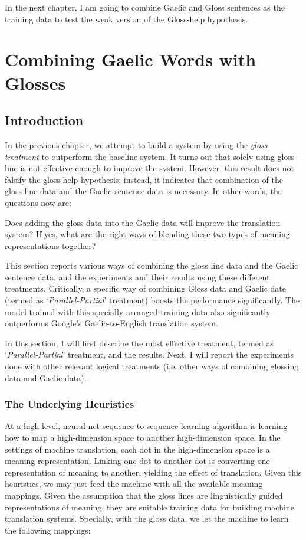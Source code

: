 \documentclass[final]{ua-thesis}
\numberwithin{equation}{section}
\begin{document}
In the next chapter, I am going to combine Gaelic and Gloss sentences as the training data to test the weak version of the Gloss-help hypothesis. 
\chapter{Combining Gaelic Words with Glosses}\label{chap:cake2}
\section{Introduction}
In the previous chapter, we attempt to build a system by using the \textit{gloss treatment} to outperform the baseline system. It turns out that solely using gloss line is not effective enough to improve the system. However, this result does not falsify the gloss-help hypothesis; instead, it indicates that combination of the gloss line data and the Gaelic sentence data is necessary. In other words, the questions now are: 
\begin{exe}
	\ex 
	\begin{xlist}
		\ex Does adding the gloss data into the Gaelic data will improve the translation system? 
		\ex If yes, what are the right ways of blending these two types of meaning representations together? 
	\end{xlist}	
\end{exe}

This section reports various ways of combining the gloss line data and the Gaelic sentence data, and the experiments and their results using these different treatments. Critically, a specific way of combining Gloss data and Gaelic date (termed as `\textit{Parallel-Partial}' treatment) boosts the performance significantly. The model trained with this specially arranged training data also significantly outperforms Google's Gaelic-to-English translation system.

In this section, I will first describe the most effective treatment, termed as `\textit{Parallel-Partial}' treatment, and the results. Next, I will report the experiments done with other relevant logical treatments (i.e. other ways of combining glossing data and Gaelic data). 

\subsection{The Underlying Heuristics}\label{heuristics}
At a high level, neural net sequence to sequence learning algorithm is learning how to map a high-dimension space to another high-dimension space. In the settings of machine translation, each dot in the high-dimension space is a meaning representation. Linking one dot to another dot is converting one representation of meaning to another, yielding the effect of translation. Given this heuristics, we may just feed the machine with all the available meaning mappings. Given the assumption that the gloss lines are linguistically guided representations of meaning, they are suitable training data for building machine translation systems. Specially, with the gloss data, we let the machine to learn the following mappings:
\end{document}

